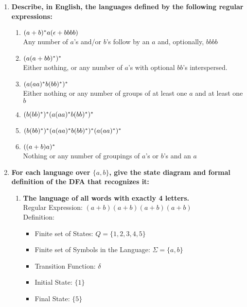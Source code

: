 \begin{enumerate}
\newpage
\item \textbf{Describe, in English, the languages defined by the following regular expressions:}
\begin{enumerate}
  \item $(a+b){}^\ast a(\epsilon+bbbb)$
  \\ Any  number of $a$'s and/or $b$'s follow by an $a$ and, optionally, $bbbb$
  \item $(a(a+bb){}^\ast){}^\ast$
  \\ Either nothing, or any number of $a$'s with optional $bb$'s interspersed.
  \item $(a(aa){}^\ast b(bb){}^\ast){}^\ast$
  \\ Either nothing or any number of groups of at least one $a$ and at least one $b$
  \item $(b(bb){}^\ast){}^\ast(a(aa){}^\ast b(bb){}^\ast){}^\ast$
  \\ 
  \item $(b(bb){}^\ast){}^\ast(a(aa){}^\ast b(bb){}^\ast){}^\ast(a(aa){}^\ast){}^\ast$
  \\ 
  \item $((a+b)a){}^\ast$
  \\ Nothing or any number of groupings of $a$'s or $b$'s and an $a$
\end{enumerate}

\newpage
\item \textbf{For each language over $\{a,b\}$, give the state diagram and formal definition of the DFA that recognizes it:}
\begin{enumerate}
  \item \textbf{The language of all words with exactly 4 letters.}
  \\
          Regular Expression: $(a+b)(a+b)(a+b)(a+b)$
  \\
  Definition: 
  \begin{itemize}
  	\item Finite set of States: $Q = \{1,2,3,4,5\}$
  	  	\item Finite set of Symbols in the Language: $\Sigma = \{a,b\}$
  	  	  	\item Transition Function: $\delta$
  	  	  	  	\item Initial State: $\{1\}$
   	  	  	  	\item Final State: $\{5\}$
  \end{itemize}
  

\end{enumerate}
\end{enumerate}
